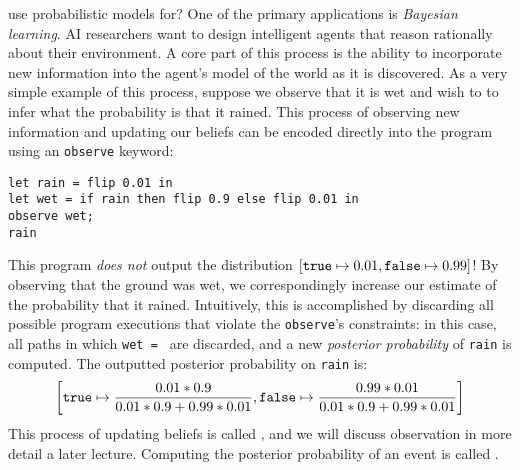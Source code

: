 \documentclass{../tufte-handout}
\begin{document}
 use probabilistic models for? One of the 
primary applications is \emph{Bayesian learning}. AI researchers want to 
design intelligent agents that reason rationally about their environment. A 
core part of this process is the ability to incorporate new information into 
the agent's model of the world as it is discovered. As a very simple example of 
this process, suppose we observe that it is wet and wish to to infer 
what the probability is that it rained. This process of observing new information 
and updating our beliefs can be encoded directly into the program using 
an \texttt{observe} keyword:

\begin{lstlisting}
let rain = flip 0.01 in
let wet = if rain then flip 0.9 else flip 0.01 in
observe wet;
rain
\end{lstlisting}

This program \emph{does not} output the distribution $[\texttt{true} \mapsto 0.01, \texttt{false} \mapsto 0.99]$!
By observing that the ground was wet, we correspondingly increase our 
estimate of the probability that it rained. Intuitively, this is accomplished 
by discarding all possible program executions that violate the \texttt{observe}'s 
constraints: in this case, all paths in which \texttt{wet = \false} are discarded, and 
a new \emph{posterior probability} of \texttt{rain} is computed. The outputted posterior 
probability on \texttt{rain} is:
\begin{align*}
  \left[\texttt{true} \mapsto \frac{0.01 * 0.9}{0.01 * 0.9 + 0.99 * 0.01}, \texttt{false} \mapsto \frac{0.99 * 0.01}{0.01 * 0.9 + 0.99 * 0.01} \right]
\end{align*}
This process of updating beliefs is called , 
and we will discuss observation in more detail a later lecture.
Computing the posterior probability of an event is called .
\end{document}
